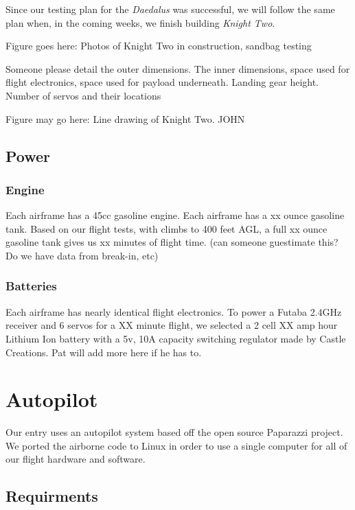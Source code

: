 \documentclass[10pt]{report}
\begin{document}
Since our testing plan for the \emph{Daedalus} was successful, we will follow the same plan when, in the coming weeks, we finish building \emph{Knight Two}.

Figure goes here: Photos of Knight Two in construction, sandbag testing

Someone please detail the outer dimensions. The inner dimensions, space used for flight electronics, space used for payload underneath. Landing gear height. Number of servos and their locations

Figure may go here: Line drawing of Knight Two. JOHN

\subsection{Power}

\subsubsection{Engine}

Each airframe has a 45cc gasoline engine. Each airframe has a xx ounce gasoline tank. Based on our flight tests, with climbs to 400 feet AGL, a full xx ounce gasoline tank gives us xx minutes of flight time. (can someone guestimate this? Do we have data from break-in, etc)

\subsubsection{Batteries}

Each airframe has nearly identical flight electronics. To power a Futaba 2.4GHz receiver and 6 servos for a XX minute flight, we selected a 2 cell XX amp hour Lithium Ion battery with a 5v, 10A capacity switching regulator made by Castle Creations. Pat will add more here if he has to.

\section{Autopilot}
Our entry uses an autopilot system based off the open source 
Paparazzi project\cite{paparazziweb}. 
We ported the airborne code to Linux in order to use a single computer for all of our flight hardware and software.

\subsection{Requirments}
\end{document}
